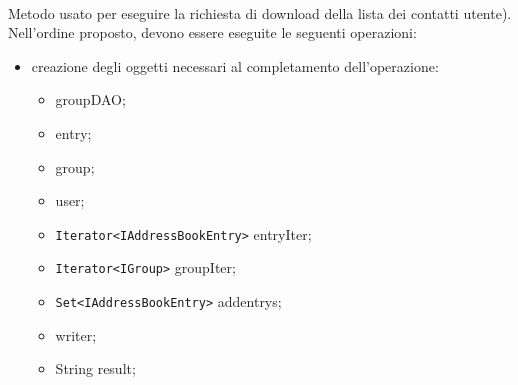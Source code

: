 \begin{description}
\item{}\\	
	Metodo usato per eseguire la richiesta di download della lista dei contatti utente). Nell'ordine proposto, devono essere eseguite le seguenti operazioni:
	\begin{itemize}
		\item creazione degli oggetti necessari al completamento dell'operazione:
		\begin{itemize}
			\item {} groupDAO;
			\item {} entry;
			\item {} group;
			\item {} user;
			\item \texttt{Iterator<IAddressBookEntry>} entryIter;
			\item \texttt{Iterator<IGroup>} groupIter;
			\item \texttt{Set<IAddressBookEntry>} addentrys;
			\item {} writer;
			\item String result;
		\end{itemize}
		

\end{itemize}
\end{description}

